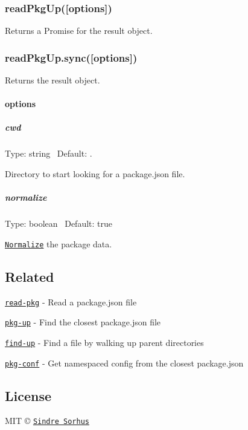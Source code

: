 \subsubsection*{read\+Pkg\+Up(\mbox{[}options\mbox{]})}

Returns a {\ttfamily Promise} for the result object.

\subsubsection*{read\+Pkg\+Up.\+sync(\mbox{[}options\mbox{]})}

Returns the result object.

\paragraph*{options}

\subparagraph*{cwd}

Type\+: {\ttfamily string}~\newline
 Default\+: {\ttfamily .}

Directory to start looking for a package.\+json file.

\subparagraph*{normalize}

Type\+: {\ttfamily boolean}~\newline
 Default\+: {\ttfamily true}

\href{https://github.com/npm/normalize-package-data#what-normalization-currently-entails}{\tt Normalize} the package data.

\subsection*{Related}


\begin{DoxyItemize}
\item \href{https://github.com/sindresorhus/read-pkg}{\tt read-\/pkg} -\/ Read a package.\+json file
\item \href{https://github.com/sindresorhus/pkg-up}{\tt pkg-\/up} -\/ Find the closest package.\+json file
\item \href{https://github.com/sindresorhus/find-up}{\tt find-\/up} -\/ Find a file by walking up parent directories
\item \href{https://github.com/sindresorhus/pkg-conf}{\tt pkg-\/conf} -\/ Get namespaced config from the closest package.\+json
\end{DoxyItemize}

\subsection*{License}

M\+IT © \href{https://sindresorhus.com}{\tt Sindre Sorhus} 